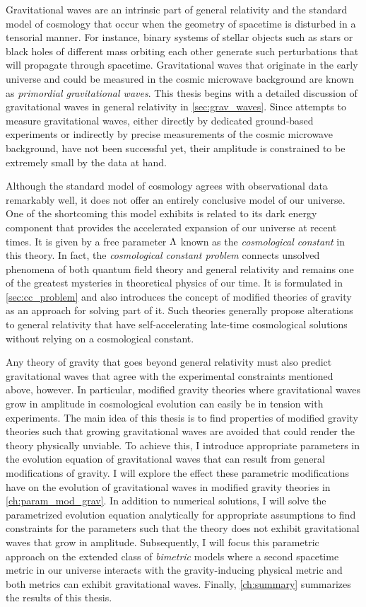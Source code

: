 \documentclass[12pt,parskip=half]{scrreprt}
\newcommand{\addref}{\todo[color=black!20]{ref.}}
\begin{document}
Gravitational waves are an intrinsic part of general relativity and the standard model of cosmology that occur when the geometry of spacetime is disturbed in a tensorial manner. For instance, binary systems of stellar objects such as stars or black holes of different mass orbiting each other generate such perturbations that will propagate through spacetime. Gravitational waves that originate in the early universe and could be measured in the cosmic microwave background are known as \emph{primordial gravitational waves}. This thesis begins with a detailed discussion of gravitational waves in general relativity in \autoref{sec:grav_waves}. Since attempts to measure gravitational waves, either directly by dedicated ground-based experiments or indirectly by precise measurements of the cosmic microwave background, have not been successful yet, their amplitude is constrained to be extremely small by the data at hand. \addref

Although the \LCDM standard model of cosmology agrees with observational data remarkably well, it does not offer an entirely conclusive model of our universe. One of the shortcoming this model exhibits is related to its dark energy component that provides the accelerated expansion of our universe at recent times. It is given by a free parameter \(\Lambda\) known as the \emph{cosmological constant} in this theory. In fact, the \emph{cosmological constant problem} connects unsolved phenomena of both quantum field theory and general relativity and remains one of the greatest mysteries in theoretical physics of our time. It is formulated in \autoref{sec:cc_problem} and also introduces the concept of modified theories of gravity as an approach for solving part of it. Such theories generally propose alterations to general relativity that have self-accelerating late-time cosmological solutions without relying on a cosmological constant.

Any theory of gravity that goes beyond general relativity must also predict gravitational waves that agree with the experimental constraints mentioned above, however. In particular, modified gravity theories where gravitational waves grow in amplitude in cosmological evolution can easily be in tension with experiments. The main idea of this thesis is to find properties of modified gravity theories such that growing gravitational waves are avoided that could render the theory physically unviable. To achieve this, I introduce appropriate parameters in the evolution equation of gravitational waves that can result from general modifications of gravity. I will explore the effect these parametric modifications have on the evolution of gravitational waves in modified gravity theories in \autoref{ch:param_mod_grav}. In addition to numerical solutions, I will solve the parametrized evolution equation analytically for appropriate assumptions to find constraints for the parameters such that the theory does not exhibit gravitational waves that grow in amplitude. Subsequently, I will focus this parametric approach on the extended class of \emph{bimetric} models where a second spacetime metric in our universe interacts with the gravity-inducing physical metric and both metrics can exhibit gravitational waves. Finally, \autoref{ch:summary} summarizes the results of this thesis.
\end{document}
